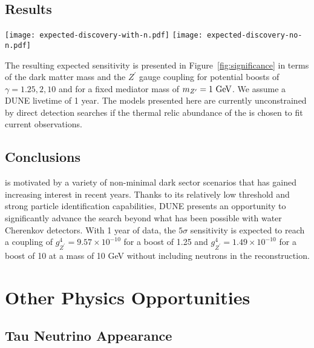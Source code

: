 \subsection{Results}

\begin{figure*}[!htb]
\centering
\texttt{[image: expected-discovery-with-n.pdf]}\hspace{0.05\textwidth}
\texttt{[image: expected-discovery-no-n.pdf]}
\caption[Expected $5\sigma$ discovery reach with 1 year of DUNE livetime]{Expected $5\sigma$ discovery reach with 1 year of DUNE livetime including neutrons in reconstruction (left) and excluding neutrons (right).\label{fig:significance}}
\end{figure*}
The resulting expected sensitivity is presented in Figure~\ref{fig:significance} in terms of the dark matter mass and the $Z^\prime$ gauge coupling for potential  boosts of $\gamma = 1.25,2,10$ and for a fixed mediator mass of $m_{Z^\prime} = 1~{\rm GeV}$.  We assume a DUNE livetime of 1 year.  The models presented here are currently unconstrained by direct detection searches if the thermal relic abundance of the  is chosen to fit current observations.

\subsection{Conclusions}

 is motivated by a variety of non-minimal dark sector scenarios that has gained increasing interest in recent years. Thanks to its relatively low threshold and strong particle identification capabilities, DUNE presents an opportunity to significantly advance the search  beyond what has been possible with water Cherenkov detectors. With 1 year of data, the $5\sigma$ sensitivity is expected to reach a coupling of $g_{Z^\prime}^4 = 9.57 \times 10^{-10}$ for a boost of 1.25 and $g_{Z^\prime}^4 = 1.49 \times 10^{-10}$ for a boost of 10 at a  mass of 10 GeV without including neutrons in the reconstruction.


\section{Other  Physics Opportunities}

\subsection{Tau Neutrino Appearance} 

